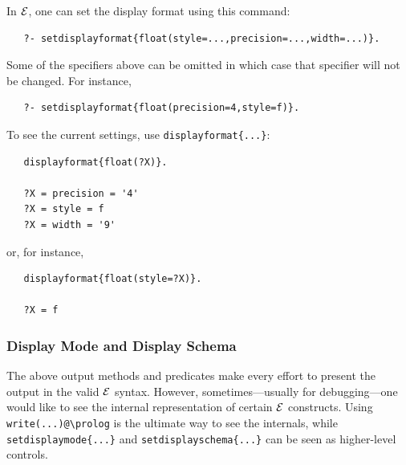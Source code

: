 \documentclass[11pt]{article}
\newcommand{\ERGO}{\mbox{\ensuremath{\cal{E}}\smaller{{\sc{RGO}}}}\xspace}
\newcommand{\FLSYSTEM}{\ERGO}
\newcommand{\bs}{\textbackslash}
\begin{document}
In \FLSYSTEM, one can set the display format using this command:
\begin{verbatim}
   ?- setdisplayformat{float(style=...,precision=...,width=...)}.
\end{verbatim}
Some of the specifiers above can be omitted in which case that specifier
will not be changed. For instance,
\begin{verbatim}
   ?- setdisplayformat{float(precision=4,style=f)}.
\end{verbatim}
To see the current settings, use \texttt{displayformat\{...\}}: 
\begin{verbatim}
   displayformat{float(?X)}.

   ?X = precision = '4'
   ?X = style = f
   ?X = width = '9'
\end{verbatim}
or, for instance,
\begin{verbatim}
   displayformat{float(style=?X)}.

   ?X = f
\end{verbatim}


\subsubsection{Display Mode and  Display Schema}\label{sec-display-mode}

The above output methods and predicates make every effort to present the
output in the valid \FLSYSTEM syntax. However, sometimes---usually for
debugging---one would like to see the internal representation of certain
\FLSYSTEM constructs. Using \texttt{write(...)@\bs{}prolog} is the ultimate
way to see the internals, while \texttt{setdisplaymode\{...\}}
and \texttt{setdisplayschema\{...\}}  
can be seen as higher-level controls.
\end{document}
